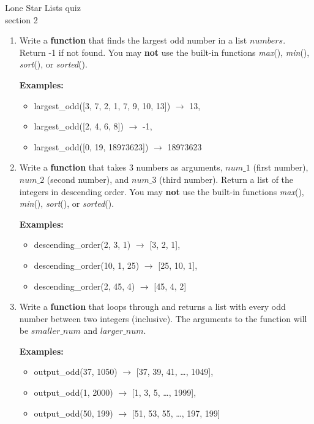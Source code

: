 \documentclass{article}
\begin{document}
\pagebreak
Lone Star \hfill Lists quiz\\
section 2\\
\begin{enumerate}
	\item 
		Write a \textbf{function} that finds the largest odd number in a list $numbers$. Return -1 if not found. 
		You may \textbf{not} use the built-in functions \textit{max}(), \textit{min}(), \textit{sort}(), or \textit{sorted}().

		\textbf{Examples:}		
		\begin{itemize}
			\item  largest\_odd([3, 7, 2, 1, 7, 9, 10, 13]) $\rightarrow$ 13,
			\item  largest\_odd([2, 4, 6, 8]) $\rightarrow$ -1,
			\item  largest\_odd([0, 19, 18973623]) $\rightarrow$ 18973623
		\end{itemize}

	\item
		Write a \textbf{function} that takes 3 numbers as arguments, $num\_1$ (first number), 
		$num\_2$ (second number), and $num\_3$ (third number). 
		Return a list of the integers in descending order. 
		You may \textbf{not} use the built-in functions \textit{max}(), \textit{min}(), 
		\textit{sort}(), or \textit{sorted}().
		
	\textbf{Examples:}
	\begin{itemize}
		\item  descending\_order(2, 3, 1) $\rightarrow$ [3, 2, 1], 
		\item  descending\_order(10, 1, 25) $\rightarrow$ [25, 10, 1], 
		\item  descending\_order(2, 45, 4) $\rightarrow$ [45, 4, 2] 
	\end{itemize}



	\item 
		Write a \textbf{function} that loops through and returns a list with every odd number between two
		integers (inclusive). The arguments to the function will be $smaller\_num$ and 
		$larger\_num$.

		\textbf{Examples:}		
		\begin{itemize}
			\item  output\_odd(37, 1050) $\rightarrow$ [37, 39, 41, \dots, 1049], 
			\item  output\_odd(1, 2000) $\rightarrow$ [1, 3, 5, \dots, 1999], 
			\item  output\_odd(50, 199) $\rightarrow$ [51, 53, 55, \dots, 197, 199]
		\end{itemize}


\end{enumerate}
\end{document}
